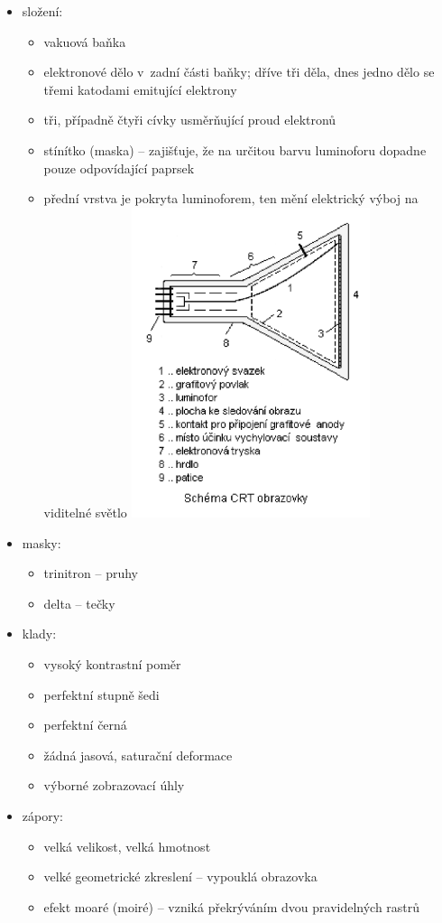 \documentclass[a4paper,12pt]{article}
\providecommand{\tightlist}{%
\setlength{\itemsep}{0pt}\setlength{\parskip}{0pt}}
\begin{document}
\begin{itemize}
  \tightlist
  \item složení:
  \begin{itemize}
    \tightlist
    \item vakuová baňka
    \item elektronové dělo v~zadní části baňky; dříve tři děla, dnes jedno dělo
    se třemi katodami emitující elektrony
    \item tři, případně čtyři cívky usměrňující proud elektronů
    \item stínítko (maska) -- zajišťuje, že na určitou barvu luminoforu dopadne
    pouze odpovídající paprsek
    \item přední vrstva je pokryta luminoforem, ten mění elektrický výboj na
    viditelné světlo
    \includegraphics[width=7cm]{ref/schema-crt-obrazovky.png}
  \end{itemize}
  \item masky:
  \begin{itemize}
    \tightlist
    \item trinitron -- pruhy
    \item delta -- tečky
  \end{itemize}
  \item klady:
  \begin{itemize}
    \tightlist
    \item vysoký kontrastní poměr
    \item perfektní stupně šedi
    \item perfektní černá
    \item žádná jasová, saturační deformace
    \item výborné zobrazovací úhly
  \end{itemize}
  \item zápory:
  \begin{itemize}
    \tightlist
    \item velká velikost, velká hmotnost
    \item velké geometrické zkreslení -- vypouklá obrazovka
    \item efekt moaré (moiré) -- vzniká překrýváním dvou pravidelných rastrů
  \end{itemize}
\end{itemize}
\end{document}

